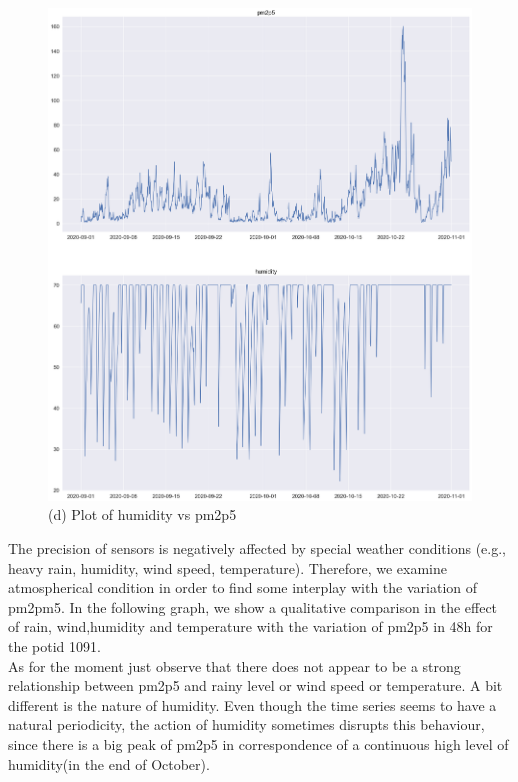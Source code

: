 \documentclass{article}
\begin{document}
\begin{figure}[h!]
\begin{minipage}[t]{0.4\textwidth}
      \includegraphics[scale=0.18]{humidityplot.png}
      \caption{(d) Plot of humidity vs pm2p5}
    \end{minipage}
  \end{figure}
The precision of sensors is negatively affected by special weather conditions (e.g.,
heavy rain, humidity, wind speed, temperature). Therefore, we examine atmospherical condition in order to find some interplay with the variation of pm2pm5.
 In the following graph, we show a qualitative comparison in the effect of rain, wind,humidity and temperature with the variation of pm2p5 in 48h for the potid 1091. 
 \\As for the moment just observe that there does not appear to be a strong relationship between
pm2p5 and rainy level or wind speed or temperature. A bit different is the nature of humidity. Even though the time series seems to
have a natural periodicity, the action of humidity sometimes disrupts this behaviour, since there is a big peak of pm2p5
in correspondence of a continuous high level of humidity(in the end of October).
\end{document}
